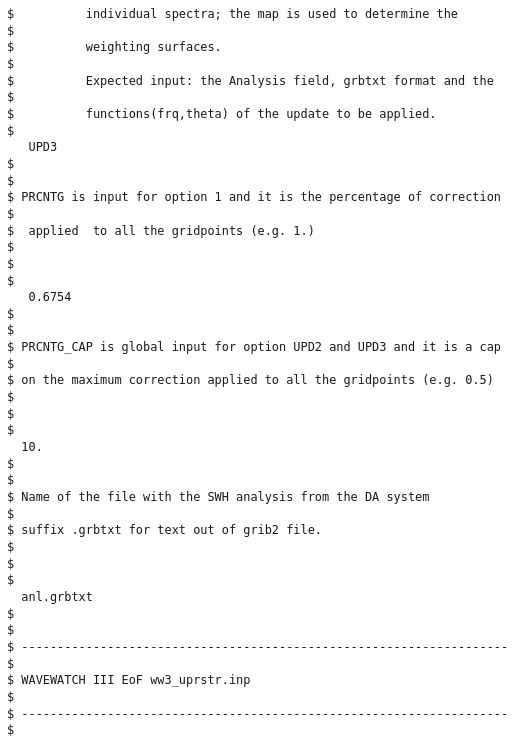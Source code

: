 \begin{footnotesize}
\begin{verbatim}
$          individual spectra; the map is used to determine the        $
$          weighting surfaces.                                         $
$          Expected input: the Analysis field, grbtxt format and the   $
$          functions(frq,theta) of the update to be applied.           $
   UPD3
$                                                                      $
$ PRCNTG is input for option 1 and it is the percentage of correction  $
$  applied  to all the gridpoints (e.g. 1.)                            $
$                                                                      $
   0.6754
$                                                                      $
$ PRCNTG_CAP is global input for option UPD2 and UPD3 and it is a cap  $
$ on the maximum correction applied to all the gridpoints (e.g. 0.5)   $
$                                                                      $
  10.
$                                                                      $
$ Name of the file with the SWH analysis from the DA system            $
$ suffix .grbtxt for text out of grib2 file.                           $
$                                                                      $
  anl.grbtxt
$                                                                      $
$ -------------------------------------------------------------------- $
$ WAVEWATCH III EoF ww3_uprstr.inp                                     $
$ -------------------------------------------------------------------- $
\end{verbatim}
\end{footnotesize}
